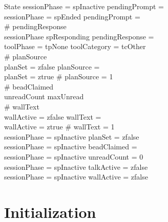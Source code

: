 \documentclass[a4paper,10pt,fleqn]{article}
\begin{document}
\begin{schema}{State}
  sessionPhase = spInactive \implies pendingPrompt = \emptyset \\
  sessionPhase = spEnded \implies pendingPrompt = \emptyset \\
  \# pendingResponse  \\
  sessionPhase \neq spResponding \implies pendingResponse = \emptyset \\
  toolPhase = tpNone \implies toolCategory = tcOther \\
  \# planSource  \\
  planSet = zfalse \implies planSource = \emptyset \\
  planSet = ztrue \implies \# planSource = 1 \\
  \# beadClaimed  \\
  unreadCount \leq maxUnread \\
  \# wallText  \\
  wallActive = zfalse \implies wallText = \emptyset \\
  wallActive = ztrue \implies \# wallText = 1 \\
  sessionPhase = spInactive \implies planSet = zfalse \\
  sessionPhase = spInactive \implies beadClaimed = \emptyset \\
  sessionPhase = spInactive \implies unreadCount = 0 \\
  sessionPhase = spInactive \implies talkActive = zfalse \\
  sessionPhase = spInactive \implies wallActive = zfalse
\end{schema}

\section{Initialization}
\end{document}
